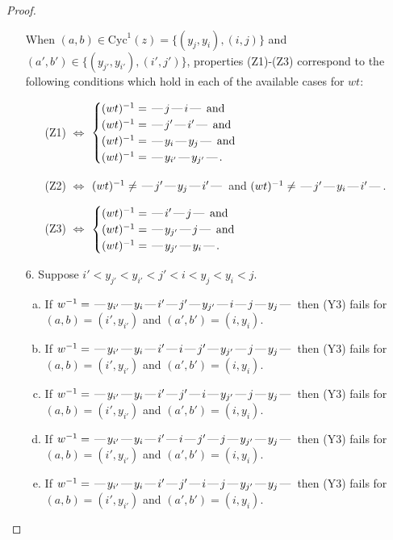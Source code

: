 \documentclass[10pt]{article}
\theoremstyle{definition}
\theoremstyle{definition}
\def\dash{\text{\hspace{0.5mm}---\hspace{0.5mm}}}
\def\Cyc{\mathrm{Cyc}}
\begin{document}
\begin{proof}
\begin{enumerate}
When $(a,b)\in\Cyc^1(z)=\{(y_j,y_i),(i,j)\}$ and $(a',b')\in\{(y_{j'},y_{i'}),(i',j')\}$,
properties (Z1)-(Z3) correspond to the following conditions which
hold in each of the available cases for $wt$:
\begin{enumerate}
\item[](Z1) $\Leftrightarrow$ $\begin{cases}\text{$(wt)^{-1} = \dash j \dash i \dash$}\text{ and }\\
\text{$(wt)^{-1} = \dash j' \dash i' \dash$}\text{ and }\\
\text{$(wt)^{-1} = \dash y_i \dash y_j \dash$}\text{ and }\\
\text{$(wt)^{-1} = \dash y_{i'} \dash y_{j'} \dash$}.\end{cases}$
\item[](Z2) $\Leftrightarrow$ $(wt)^{-1} \neq \dash j' \dash y_j \dash i' \dash$ and $(wt)^{-1}\neq \dash j' \dash y_i \dash i' \dash$.
\item[](Z3) $\Leftrightarrow$ $\begin{cases}\text{$(wt)^{-1} = \dash i' \dash j \dash$}\text{ and }\\
\text{$(wt)^{-1} = \dash y_{j'} \dash j \dash$}\text{ and }\\
\text{$(wt)^{-1} = \dash y_{j'} \dash y_i \dash$}.\end{cases}$
\end{enumerate}
\item[$6$.] Suppose $i' < y_{j'} < y_{i'} < j' < i < y_j < y_i < j$.
\begin{enumerate}[(a)]
\item If $w^{-1} = \dash y_{i'}\dash y_i\dash i'\dash j'\dash y_{j'}\dash i\dash j\dash y_j\dash $ then (Y3) fails for $(a,b)=(i',y_{i'})$ and $(a',b')=(i,y_i)$.
\item If $w^{-1} = \dash y_{i'}\dash y_i\dash i'\dash i\dash j'\dash y_{j'}\dash j\dash y_j\dash $ then (Y3) fails for $(a,b)=(i',y_{i'})$ and $(a',b')=(i,y_i)$.
\item If $w^{-1} = \dash y_{i'}\dash y_i\dash i'\dash j'\dash i\dash y_{j'}\dash j\dash y_j\dash $ then (Y3) fails for $(a,b)=(i',y_{i'})$ and $(a',b')=(i,y_i)$.
\item If $w^{-1} = \dash y_{i'}\dash y_i\dash i'\dash i\dash j'\dash j\dash y_{j'}\dash y_j\dash $ then (Y3) fails for $(a,b)=(i',y_{i'})$ and $(a',b')=(i,y_i)$.
\item If $w^{-1} = \dash y_{i'}\dash y_i\dash i'\dash j'\dash i\dash j\dash y_{j'}\dash y_j\dash $ then (Y3) fails for $(a,b)=(i',y_{i'})$ and $(a',b')=(i,y_i)$.

\end{enumerate}
\end{enumerate}
\end{proof}
\end{document}

